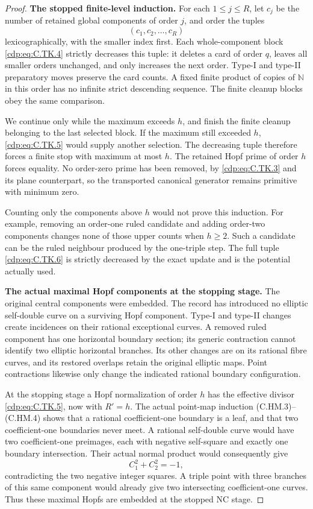\begin{proof}
\par\medskip\noindent\textbf{The stopped finite-level induction.}
For each \(1\le j\le R\), let \(c_j\) be the
number of retained global components of order
\(j\), and order the tuples
\[
                     (c_1,c_2,\ldots,c_R)
 \tag{C.TK.6}\label{cdp:eq:C.TK.6}
\]
lexicographically, with the smaller index first.
Each whole-component block \eqref{cdp:eq:C.TK.4} strictly
decreases this tuple: it deletes a card of
order \(q\), leaves all smaller orders unchanged,
and only increases the next order. Type-I and
type-II preparatory moves preserve the card
counts. A fixed finite product of copies of
\(\mathbb N\) in this order has no infinite
strict descending sequence. The finite cleanup
blocks obey the same comparison.

We continue only while the maximum exceeds
\(h\), and finish the finite cleanup belonging
to the last selected block. If the maximum
still exceeded \(h\), \eqref{cdp:eq:C.TK.5} would supply
another selection. The decreasing tuple
therefore forces a finite stop with maximum
at most \(h\). The retained Hopf prime of
order \(h\) forces equality. No order-zero
prime has been removed, by \eqref{cdp:eq:C.TK.3} and its
plane counterpart, so the transported canonical
generator remains primitive with minimum zero.

Counting only the components above \(h\)
would not prove this induction. For example,
removing an order-one ruled candidate and
adding order-two components changes none of
those upper counts when \(h\ge2\). Such a
candidate can be the ruled neighbour produced
by the one-triple step. The full tuple
\eqref{cdp:eq:C.TK.6} is strictly decreased by the exact
update and is the potential actually used.

\par\medskip\noindent\textbf{The actual maximal Hopf components at the stopping stage.}
The original central components were embedded.
The record has introduced no elliptic self-double
curve on a surviving Hopf component. Type-I and
type-II changes create incidences on their
rational exceptional curves. A removed ruled
component has one horizontal boundary section;
its generic contraction cannot identify two
elliptic horizontal branches. Its other changes
are on its rational fibre curves, and its
restored overlaps retain the original elliptic
maps. Point contractions likewise only change
the indicated rational boundary configuration.

At the stopping stage a Hopf normalization
of order \(h\) has the effective divisor
\eqref{cdp:eq:C.TK.5}, now with \(R'=h\). The actual
point-map induction (C.HM.3)--(C.HM.4)
shows that a rational coefficient-one boundary
is a leaf, and that two coefficient-one
boundaries never meet. A rational self-double
curve would have two coefficient-one preimages,
each with negative self-square and exactly
one boundary intersection. Their actual normal
product would consequently give
\[
                        C_1^2+C_2^2=-1,
 \tag{C.TK.7}\label{cdp:eq:C.TK.7}
\]
contradicting the two negative integer squares.
A triple point with three branches of this same
component would already give two intersecting
coefficient-one curves. Thus these maximal
Hopfs are embedded at the stopped NC stage.


\end{proof}
